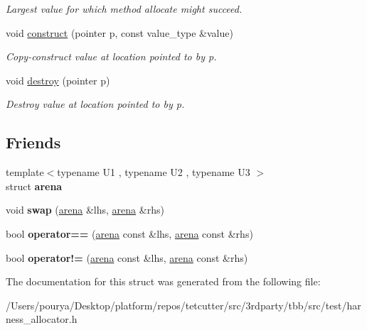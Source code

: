 \begin{DoxyCompactItemize}
\begin{DoxyCompactList}\small\item\em Largest value for which method allocate might succeed. \end{DoxyCompactList}\item 
\hypertarget{structarena_a8235ba411a7f0d0d99ffc1454c967846}{}void \hyperlink{structarena_a8235ba411a7f0d0d99ffc1454c967846}{construct} (pointer p, const value\+\_\+type \&value)\label{structarena_a8235ba411a7f0d0d99ffc1454c967846}

\begin{DoxyCompactList}\small\item\em Copy-\/construct value at location pointed to by p. \end{DoxyCompactList}\item 
\hypertarget{structarena_a685fb845d79a958a7d11523693fcafc5}{}void \hyperlink{structarena_a685fb845d79a958a7d11523693fcafc5}{destroy} (pointer p)\label{structarena_a685fb845d79a958a7d11523693fcafc5}

\begin{DoxyCompactList}\small\item\em Destroy value at location pointed to by p. \end{DoxyCompactList}\end{DoxyCompactItemize}
\subsection*{Friends}
\begin{DoxyCompactItemize}
\item 
\hypertarget{structarena_afd248f4d9b4690546260ea1fb302181a}{}{\footnotesize template$<$typename U1 , typename U2 , typename U3 $>$ }\\struct {\bfseries arena}\label{structarena_afd248f4d9b4690546260ea1fb302181a}

\item 
\hypertarget{structarena_abf008e84b8a07435aa8adf467cbd88f7}{}void {\bfseries swap} (\hyperlink{structarena}{arena} \&lhs, \hyperlink{structarena}{arena} \&rhs)\label{structarena_abf008e84b8a07435aa8adf467cbd88f7}

\item 
\hypertarget{structarena_a56e114f809d2978b2d5975af605bcb78}{}bool {\bfseries operator==} (\hyperlink{structarena}{arena} const \&lhs, \hyperlink{structarena}{arena} const \&rhs)\label{structarena_a56e114f809d2978b2d5975af605bcb78}

\item 
\hypertarget{structarena_a34a8cd2d5d50382959cc801278bf824d}{}bool {\bfseries operator!=} (\hyperlink{structarena}{arena} const \&lhs, \hyperlink{structarena}{arena} const \&rhs)\label{structarena_a34a8cd2d5d50382959cc801278bf824d}

\end{DoxyCompactItemize}


The documentation for this struct was generated from the following file\+:\begin{DoxyCompactItemize}
\item 
/\+Users/pourya/\+Desktop/platform/repos/tetcutter/src/3rdparty/tbb/src/test/harness\+\_\+allocator.\+h\end{DoxyCompactItemize}
